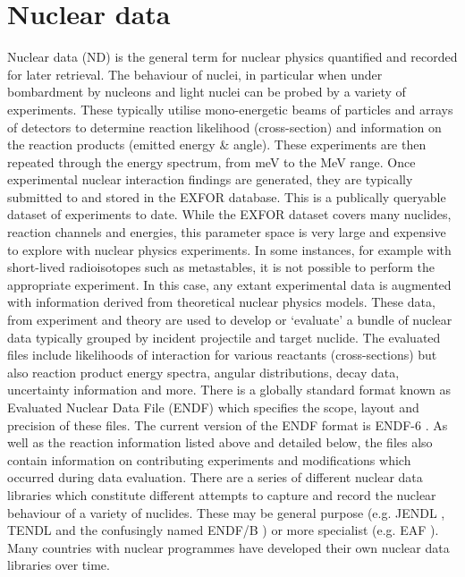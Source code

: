 \section{Nuclear data}
Nuclear data (ND) is the general term for nuclear physics quantified and recorded for later retrieval. The behaviour of nuclei, in particular when under bombardment by nucleons and light nuclei can be probed by a variety of experiments. These typically utilise mono-energetic beams of particles and arrays of detectors to determine reaction likelihood (cross-section) and information on the reaction products (emitted energy \& angle). These experiments are then repeated through the energy spectrum, from meV to the MeV range. Once experimental nuclear interaction findings are generated, they are typically submitted to and stored in the EXFOR database. This is a publically queryable dataset of experiments to date. While the EXFOR dataset covers many nuclides, reaction channels and energies, this parameter space is very large and expensive to explore with nuclear physics experiments. In some instances, for example with short-lived radioisotopes such as metastables, it is not possible to perform the appropriate experiment. In this case, any extant experimental data is augmented with information derived from theoretical nuclear physics models. These data, from experiment and theory are used to develop or `evaluate' a bundle of nuclear data typically grouped by incident projectile and target nuclide. The evaluated files include likelihoods of interaction for various reactants (cross-sections) but also reaction product energy spectra, angular distributions, decay data, uncertainty information and more. There is a globally standard format known as Evaluated Nuclear Data File (ENDF)  which specifies the scope, layout and precision of these files. The current version of the ENDF format is ENDF-6 \cite{Herman2010}. As well as the reaction information listed above and detailed below, the files also contain information on contributing experiments and modifications which occurred during data evaluation. There are a series of different nuclear data libraries which constitute different attempts to capture and record the nuclear behaviour of a variety of nuclides. These may be general purpose (e.g. JENDL \cite{shibata2011},  TENDL \cite{Rochman2016}  and the confusingly named ENDF/B \cite{brown2018}) or more specialist (e.g. EAF\cite{packer2011} ). Many countries with nuclear programmes have developed their own nuclear data libraries over time. 

